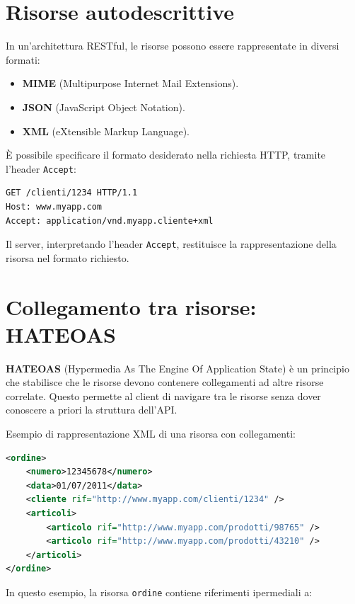 \section{Risorse autodescrittive}

In un'architettura RESTful, le risorse possono essere rappresentate in diversi formati:

\begin{itemize}
    \item \textbf{MIME} (Multipurpose Internet Mail Extensions).
    \item \textbf{JSON} (JavaScript Object Notation).
    \item \textbf{XML} (eXtensible Markup Language).
\end{itemize}

È possibile specificare il formato desiderato nella richiesta HTTP, tramite l'header \texttt{Accept}:

\begin{verbatim}
GET /clienti/1234 HTTP/1.1
Host: www.myapp.com
Accept: application/vnd.myapp.cliente+xml
\end{verbatim}

Il server, interpretando l'header \texttt{Accept}, restituisce la rappresentazione della risorsa nel formato richiesto.

\section{Collegamento tra risorse: HATEOAS}

\textbf{HATEOAS} (Hypermedia As The Engine Of Application State) è un principio che stabilisce che le risorse devono contenere collegamenti ad altre risorse correlate. Questo permette al client di navigare tra le risorse senza dover conoscere a priori la struttura dell'API.

Esempio di rappresentazione XML di una risorsa con collegamenti:

\begin{lstlisting}[language=XML]
<ordine>
    <numero>12345678</numero>
    <data>01/07/2011</data>
    <cliente rif="http://www.myapp.com/clienti/1234" />
    <articoli>
        <articolo rif="http://www.myapp.com/prodotti/98765" />
        <articolo rif="http://www.myapp.com/prodotti/43210" />
    </articoli>
</ordine>
\end{lstlisting}

In questo esempio, la risorsa \texttt{ordine} contiene riferimenti ipermediali a:

